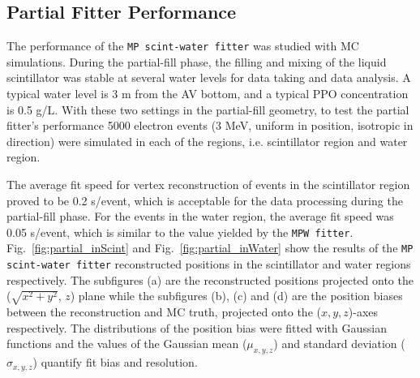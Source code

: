 \subsection{Partial Fitter Performance}

The performance of the \texttt{MP scint-water fitter} was studied with MC simulations. During the partial-fill phase, the filling and mixing of the liquid scintillator was stable at several water levels for data taking and data analysis. A typical water level is 3 m from the AV bottom, and a typical PPO concentration is 0.5 g/L. With these two settings in the partial-fill geometry, to test the partial fitter's performance 5000  electron events (3 MeV, uniform in position, isotropic in direction) were simulated in each of the regions, i.e. scintillator region and water region.

The average fit speed for vertex reconstruction of events in the scintillator region proved to be 0.2 s/event, which is acceptable for the data processing during the partial-fill phase. For the events in the water region, the average fit speed was 0.05 s/event, which is similar to the value yielded by the \texttt{MPW fitter}. Fig.~\ref{fig:partial_inScint} and Fig.~\ref{fig:partial_inWater} show the results of the \texttt{MP scint-water fitter} reconstructed positions in the scintillator and water regions respectively. The subfigures (a) are the reconstructed positions projected onto the ($\sqrt{x^2+y^2}$, $z$) plane while the subfigures (b), (c) and (d) are the position biases between the reconstruction and MC truth, projected onto the ($x,y,z$)-axes respectively. The distributions of the position bias were fitted with Gaussian functions and the values of the Gaussian mean ($\mu_{x,y,z}$) and standard deviation ($\sigma_{x,y,z}$) quantify fit bias and resolution.

